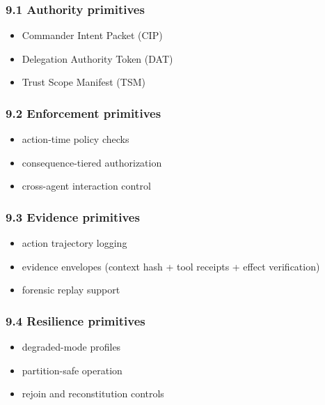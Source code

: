 \documentclass[11pt]{article}
\begin{document}
\hypertarget{authority-primitives}{%
\subsubsection{9.1 Authority primitives}\label{authority-primitives}}

\begin{itemize}
\tightlist
\item
  Commander Intent Packet (CIP)
\item
  Delegation Authority Token (DAT)
\item
  Trust Scope Manifest (TSM)
\end{itemize}

\hypertarget{enforcement-primitives}{%
\subsubsection{9.2 Enforcement
primitives}\label{enforcement-primitives}}

\begin{itemize}
\tightlist
\item
  action-time policy checks
\item
  consequence-tiered authorization
\item
  cross-agent interaction control
\end{itemize}

\hypertarget{evidence-primitives}{%
\subsubsection{9.3 Evidence primitives}\label{evidence-primitives}}

\begin{itemize}
\tightlist
\item
  action trajectory logging
\item
  evidence envelopes (context hash + tool receipts + effect
  verification)
\item
  forensic replay support
\end{itemize}

\hypertarget{resilience-primitives}{%
\subsubsection{9.4 Resilience primitives}\label{resilience-primitives}}

\begin{itemize}
\tightlist
\item
  degraded-mode profiles
\item
  partition-safe operation
\item
  rejoin and reconstitution controls
\end{itemize}
\end{document}
